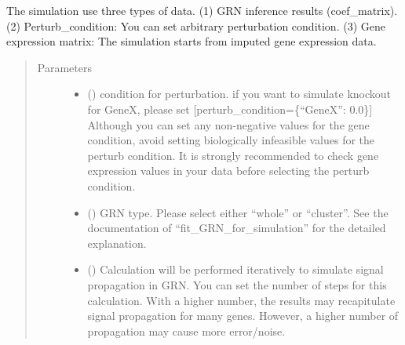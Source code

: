 \documentclass[letterpaper,10pt,english]{sphinxmanual}
\begin{document}
\begin{fulllineitems}
\begin{fulllineitems}
The simulation use three types of data.
(1) GRN inference results (coef\_matrix).
(2) Perturb\_condition: You can set arbitrary perturbation condition.
(3) Gene expression matrix: The simulation starts from imputed gene expression data.
\begin{quote}\begin{description}
\item[{Parameters}] \leavevmode\begin{itemize}
\item {} 
 () \textendash{} condition for perturbation.
if you want to simulate knockout for GeneX, please set {[}perturb\_condition=\{“GeneX”: 0.0\}{]}
Although you can set any non-negative values for the gene condition, avoid setting biologically infeasible values for the perturb condition.
It is strongly recommended to check gene expression values in your data before selecting the perturb condition.

\item {} 
 () \textendash{} GRN type. Please select either “whole” or “cluster”. See the documentation of “fit\_GRN\_for\_simulation” for the detailed explanation.

\item {} 
 () \textendash{} Calculation will be performed iteratively to simulate signal propagation in GRN.
You can set the number of steps for this calculation.
With a higher number, the results may recapitulate signal propagation for many genes.
However, a higher number of propagation may cause more error/noise.

\end{itemize}

\end{description}\end{quote}

\end{fulllineitems}



\end{fulllineitems}
\end{document}
